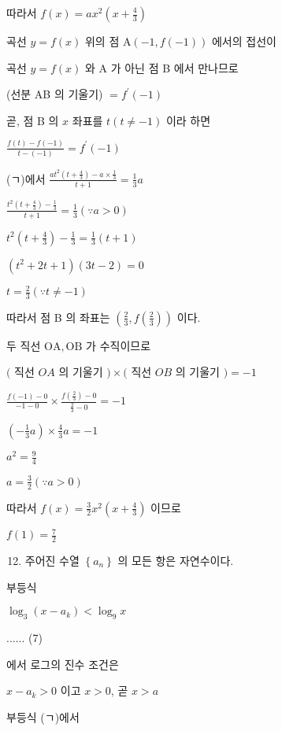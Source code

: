\documentclass[10pt]{article}
\begin{document}
따라서 \(f(x)=a x^{2}\left(x+\frac{4}{3}\right)\)

곡선 \(y=f(x)\) 위의 점 \(\mathrm{A}(-1, f(-1))\) 에서의 접선이

곡선 \(y=f(x)\) 와 A 가 아닌 점 B 에서 만나므로

(선분 AB 의 기울기) \(=f^{\prime}(-1)\)

곧, 점 B 의 \(x\) 좌표를 \(t(t \neq-1)\) 이라 하면

\(\frac{f(t)-f(-1)}{t-(-1)}=f^{\prime}(-1)\)

(ㄱ)에서 \(\frac{a t^{2}\left(t+\frac{4}{3}\right)-a \times \frac{1}{3}}{t+1}=\frac{1}{3} a\)

\(\frac{t^{2}\left(t+\frac{4}{3}\right)-\frac{1}{3}}{t+1}=\frac{1}{3}(\because a>0)\)

\(t^{2}\left(t+\frac{4}{3}\right)-\frac{1}{3}=\frac{1}{3}(t+1)\)

\(\left(t^{2}+2 t+1\right)(3 t-2)=0\)

\(t=\frac{2}{3}(\because t \neq-1)\)

따라서 점 B 의 좌표는 \(\left(\frac{2}{3}, f\left(\frac{2}{3}\right)\right)\) 이다.

두 직선 \(\mathrm{OA}, \mathrm{OB}\) 가 수직이므로

\((\) 직선 \(O A\) 의 기울기 \() \times(\) 직선 \(O B\) 의 기울기 \()=-1\)

\(\frac{f(-1)-0}{-1-0} \times \frac{f\left(\frac{2}{3}\right)-0}{\frac{2}{3}-0}=-1\)

\(\left(-\frac{1}{3} a\right) \times \frac{4}{3} a=-1\)

\(a^{2}=\frac{9}{4}\)

\(a=\frac{3}{2}(\because a>0)\)

따라서 \(f(x)=\frac{3}{2} x^{2}\left(x+\frac{4}{3}\right)\) 이므로

\(f(1)=\frac{7}{2}\)

\begin{enumerate}
  \setcounter{enumi}{11}
  \item 주어진 수열 \(\left\{a_{n}\right\}\) 의 모든 항은 자연수이다.
\end{enumerate}

부등식

\(\log _{3}\left(x-a_{k}\right)<\log _{9} x\)

...... (7)

에서 로그의 진수 조건은

\(x-a_{k}>0\) 이고 \(x>0\), 곧 \(x>a\)

부등식 (ㄱ)에서
\end{document}
